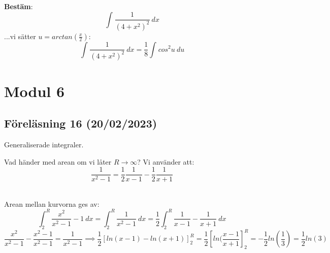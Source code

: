 \documentclass{report}
\begin{document}
\ex{}
{
\textbf{Bestäm}:
\begin{equation*}
\int_{}^{} \frac{1}{(4+x^2)^2}  \: dx  
\end{equation*}
...vi sätter $ u = arctan( \frac{x}{2} ) $:
\begin{equation*}
\int_{}^{} \frac{1}{(4+x^2)^2}  \: dx = \frac{1}{8} \int_{}^{} cos^2u \: du  
\end{equation*}

}

\pagebreak
\chapter{Modul 6}
\section{Föreläsning 16 (20/02/2023)}
Generaliserade integraler.\\

{
Vad händer med arean om vi låter $ R \to \infty $? Vi använder att:
\begin{equation*}
	\frac{1}{x^2-1} = \frac{1}{2} \frac{1}{x-1} - \frac{1}{2} \frac{1}{x+1} 
\end{equation*}
\\
Arean mellan kurvorna ges av:
\begin{equation*}
\int_{2}^{R} \frac{x^2}{x^2-1} -1 \: dx = \int_{2}^{R} \frac{1}{x^2-1}  \: dx = \frac{1}{2} \int_{2}^{R} \frac{1}{x-1} - \frac{1}{x+1}  \: dx   
\end{equation*}
\begin{equation*}
	\frac{x^2}{x^2-1}  - \frac{x^2-1}{x^2-1} = \frac{1}{x^2-1} \implies \frac{1}{2} [ ln(x-1) - ln(x+1) ]_{2}^{R}  = \frac{1}{2} [ln( \frac{x-1}{x+1} ]_{2}^{R} = - \frac{1}{2} ln( \frac{1}{3} ) = \frac{1}{2} ln(3) 
\end{equation*}
}
\end{document}
